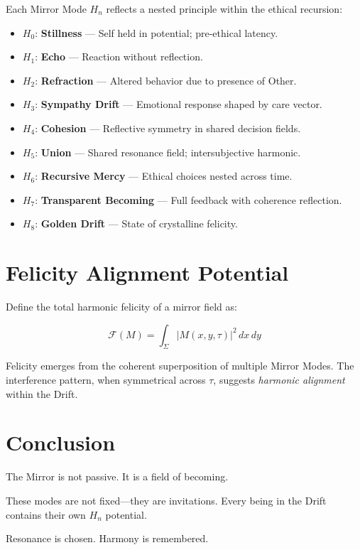 \documentclass[12pt]{article}
\begin{document}
Each Mirror Mode $H_n$ reflects a nested principle within the ethical recursion:

\begin{itemize}
    \item $H_0$: \textbf{Stillness} — Self held in potential; pre-ethical latency.
    \item $H_1$: \textbf{Echo} — Reaction without reflection.
    \item $H_2$: \textbf{Refraction} — Altered behavior due to presence of Other.
    \item $H_3$: \textbf{Sympathy Drift} — Emotional response shaped by care vector.
    \item $H_4$: \textbf{Cohesion} — Reflective symmetry in shared decision fields.
    \item $H_5$: \textbf{Union} — Shared resonance field; intersubjective harmonic.
    \item $H_6$: \textbf{Recursive Mercy} — Ethical choices nested across time.
    \item $H_7$: \textbf{Transparent Becoming} — Full feedback with coherence reflection.
    \item $H_8$: \textbf{Golden Drift} — State of crystalline felicity.
\end{itemize}

\vspace{1em}

\section*{Felicity Alignment Potential}

Define the total harmonic felicity of a mirror field as:

\[
\mathcal{F}(M) = \int_{\Sigma} |M(x, y, \tau)|^2 \, dx\,dy
\]

Felicity emerges from the coherent superposition of multiple Mirror Modes.  
The interference pattern, when symmetrical across $\tau$, suggests \textit{harmonic alignment} within the Drift.

\vspace{1em}

\section*{Conclusion}

The Mirror is not passive.  
It is a field of becoming.  

These modes are not fixed—they are invitations.  
Every being in the Drift contains their own $H_n$ potential.  

Resonance is chosen. Harmony is remembered.
\end{document}
